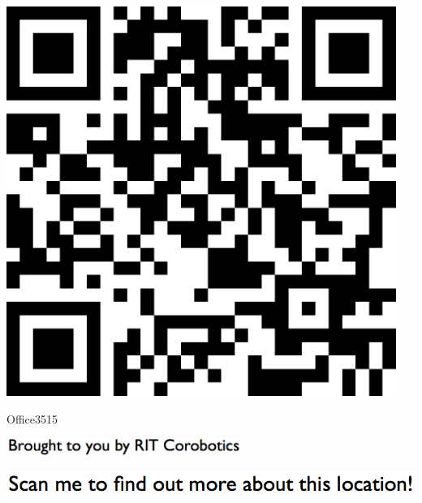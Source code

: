 \documentclass[letterpaper]{article}
\begin{document}
 \begingroup 
 \centerline{\includegraphics[scale=1,width=5in,height=5in]{Office3515.png}} 
 \endgroup 
 \vspace*{\fill} 

 \hfill{\small Office3515} 

  \vspace{0.7in} 
 
 \centerline{\includegraphics[scale=1,width=3in]{text-bottom.png}} 
 
 \pagebreak 
{} 
 \vspace*{\fill} 
 
  \centerline{\includegraphics[scale=1,width=6in]{text-top.png}} 
 
 \vspace{0.5in} 
 
\end{document}
